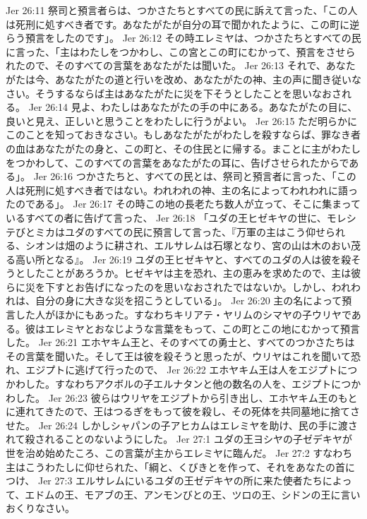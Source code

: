 Jer 26:11  祭司と預言者らは、つかさたちとすべての民に訴えて言った、「この人は死刑に処すべき者です。あなたがたが自分の耳で聞かれたように、この町に逆らう預言をしたのです」。
Jer 26:12  その時エレミヤは、つかさたちとすべての民に言った、「主はわたしをつかわし、この宮とこの町にむかって、預言をさせられたので、そのすべての言葉をあなたがたは聞いた。
Jer 26:13  それで、あなたがたは今、あなたがたの道と行いを改め、あなたがたの神、主の声に聞き従いなさい。そうするならば主はあなたがたに災を下そうとしたことを思いなおされる。
Jer 26:14  見よ、わたしはあなたがたの手の中にある。あなたがたの目に、良いと見え、正しいと思うことをわたしに行うがよい。
Jer 26:15  ただ明らかにこのことを知っておきなさい。もしあなたがたがわたしを殺すならば、罪なき者の血はあなたがたの身と、この町と、その住民とに帰する。まことに主がわたしをつかわして、このすべての言葉をあなたがたの耳に、告げさせられたからである」。
Jer 26:16  つかさたちと、すべての民とは、祭司と預言者に言った、「この人は死刑に処すべき者ではない。われわれの神、主の名によってわれわれに語ったのである」。
Jer 26:17  その時この地の長老たち数人が立って、そこに集まっているすべての者に告げて言った、
Jer 26:18  「ユダの王ヒゼキヤの世に、モレシテびとミカはユダのすべての民に預言して言った、『万軍の主はこう仰せられる、シオンは畑のように耕され、エルサレムは石塚となり、宮の山は木のおい茂る高い所となる』。
Jer 26:19  ユダの王ヒゼキヤと、すべてのユダの人は彼を殺そうとしたことがあろうか。ヒゼキヤは主を恐れ、主の恵みを求めたので、主は彼らに災を下すとお告げになったのを思いなおされたではないか。しかし、われわれは、自分の身に大きな災を招こうとしている」。
Jer 26:20  主の名によって預言した人がほかにもあった。すなわちキリアテ・ヤリムのシマヤの子ウリヤである。彼はエレミヤとおなじような言葉をもって、この町とこの地にむかって預言した。
Jer 26:21  エホヤキム王と、そのすべての勇士と、すべてのつかさたちはその言葉を聞いた。そして王は彼を殺そうと思ったが、ウリヤはこれを聞いて恐れ、エジプトに逃げて行ったので、
Jer 26:22  エホヤキム王は人をエジプトにつかわした。すなわちアクボルの子エルナタンと他の数名の人を、エジプトにつかわした。
Jer 26:23  彼らはウリヤをエジプトから引き出し、エホヤキム王のもとに連れてきたので、王はつるぎをもって彼を殺し、その死体を共同墓地に捨てさせた。
Jer 26:24  しかしシャパンの子アヒカムはエレミヤを助け、民の手に渡されて殺されることのないようにした。
Jer 27:1  ユダの王ヨシヤの子ゼデキヤが世を治め始めたころ、この言葉が主からエレミヤに臨んだ。
Jer 27:2  すなわち主はこうわたしに仰せられた、「綱と、くびきとを作って、それをあなたの首につけ、
Jer 27:3  エルサレムにいるユダの王ゼデキヤの所に来た使者たちによって、エドムの王、モアブの王、アンモンびとの王、ツロの王、シドンの王に言いおくりなさい。
